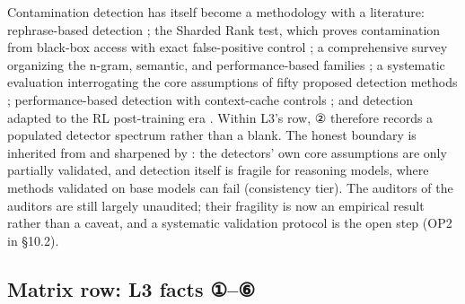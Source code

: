 \documentclass[11pt,a4paper]{article}
\begin{document}
Contamination detection has itself become a methodology with a literature: rephrase-based detection \cite{key36}; the Sharded Rank test, which proves contamination from black-box access with exact false-positive control \cite{key37}; a comprehensive survey organizing the n-gram, semantic, and performance-based families \cite{key38}; a systematic evaluation interrogating the core assumptions of fifty proposed detection methods \cite{key39}; performance-based detection with context-cache controls \cite{key40}; and detection adapted to the RL post-training era \cite{key41}. Within L3's row, ② therefore records a populated detector spectrum rather than a blank. The honest boundary is inherited from \cite{key39} and sharpened by \cite{key42}: the detectors' own core assumptions are only partially validated, and detection itself is fragile for reasoning models, where methods validated on base models can fail \cite{key42} (consistency tier). The auditors of the auditors are still largely unaudited; their fragility is now an empirical result rather than a caveat, and a systematic validation protocol is the open step (OP2 in §10.2).

\subsection{Matrix row: L3 facts ①–⑥}
\end{document}
